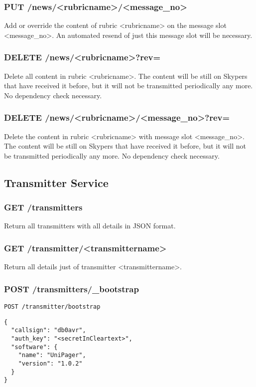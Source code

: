 \subsubsection{PUT /news/<rubricname>/<message\_no>}
Add or override the content of rubric <rubricname> on the message slot <message\_no>. An automated resend of just this message slot will be necessary.

\subsubsection{DELETE /news/<rubricname>?rev=}
Delete all content in rubric <rubricname>. The content will be still on Skypers that have received it before, but it will not be transmitted periodically any more. No dependency check necessary.

\subsubsection{DELETE /news/<rubricname>/<message\_no>?rev=}
Delete the content in rubric <rubricname> with message slot <message\_no>. The content will be still on Skypers that have received it before, but it will not be transmitted periodically any more. No dependency check necessary.

\subsection{Transmitter Service}

\subsubsection{GET /transmitters}
Return all transmitters with all details in JSON format.

\subsubsection{GET /transmitter/<transmittername>}
\label{protocoldef:microservicesapi:database:gettransmittername}
Return all details just of transmitter <transmittername>.

\subsubsection{POST /transmitters/\_bootstrap}
\label{protcoldef:transmitters:bootstrap}
\texttt{POST /transmitter/bootstrap}
\begin{lstlisting}
{
  "callsign": "db0avr",
  "auth_key": "<secretInCleartext>",
  "software": {
    "name": "UniPager",
    "version": "1.0.2"
  }
}
\end{lstlisting}

